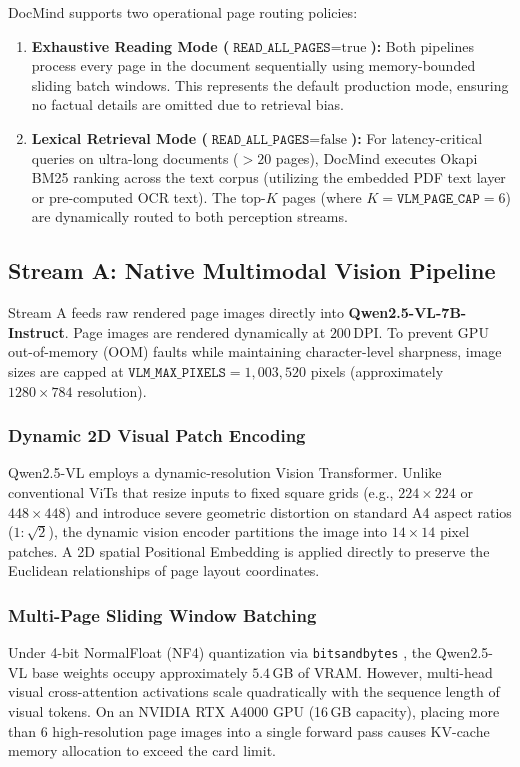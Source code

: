 \documentclass[conference]{IEEEtran}
\begin{document}
DocMind supports two operational page routing policies:
\begin{enumerate}
    \item \textbf{Exhaustive Reading Mode ($\texttt{READ\_ALL\_PAGES}=\text{true}$):} Both pipelines process every page in the document sequentially using memory-bounded sliding batch windows. This represents the default production mode, ensuring no factual details are omitted due to retrieval bias.
    \item \textbf{Lexical Retrieval Mode ($\texttt{READ\_ALL\_PAGES}=\text{false}$):} For latency-critical queries on ultra-long documents ($>20$ pages), DocMind executes Okapi BM25 ranking across the text corpus (utilizing the embedded PDF text layer or pre-computed OCR text). The top-$K$ pages (where $K = \texttt{VLM\_PAGE\_CAP} = 6$) are dynamically routed to both perception streams.
\end{enumerate}

\subsection{Stream A: Native Multimodal Vision Pipeline}
Stream A feeds raw rendered page images directly into \textbf{Qwen2.5-VL-7B-Instruct}. Page images are rendered dynamically at $200$\,DPI. To prevent GPU out-of-memory (OOM) faults while maintaining character-level sharpness, image sizes are capped at $\texttt{VLM\_MAX\_PIXELS} = 1,003,520$ pixels (approximately $1280 \times 784$ resolution).

\subsubsection{Dynamic 2D Visual Patch Encoding}
Qwen2.5-VL employs a dynamic-resolution Vision Transformer. Unlike conventional ViTs that resize inputs to fixed square grids (e.g., $224 \times 224$ or $448 \times 448$) and introduce severe geometric distortion on standard A4 aspect ratios ($1 : \sqrt{2}$), the dynamic vision encoder partitions the image into $14 \times 14$ pixel patches. A 2D spatial Positional Embedding is applied directly to preserve the Euclidean relationships of page layout coordinates.

\subsubsection{Multi-Page Sliding Window Batching}
Under 4-bit NormalFloat (NF4) quantization via \texttt{bitsandbytes} \cite{b26}, the Qwen2.5-VL base weights occupy approximately $5.4$\,GB of VRAM. However, multi-head visual cross-attention activations scale quadratically with the sequence length of visual tokens. On an NVIDIA RTX A4000 GPU (16\,GB capacity), placing more than 6 high-resolution page images into a single forward pass causes KV-cache memory allocation to exceed the card limit. 
\end{document}
